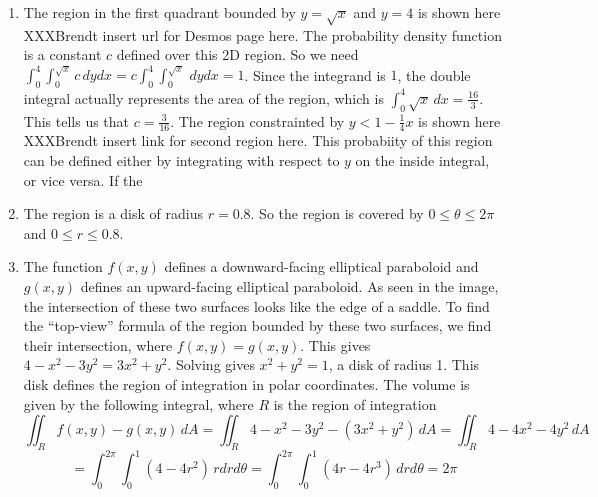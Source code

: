 \documentclass{article}
\begin{document}
\begin{enumerate}
    \item The region in the first quadrant bounded by $y=\sqrt{x}$ and $y=4$ is shown here XXXBrendt insert url for Desmos page here. The probability density function is a constant $c$ defined over this 2D region. So we need $\int_0^4\int_0^{\sqrt{x}} c \,dydx = c\int_0^4\int_0^{\sqrt{x}} \,dydx = 1$. Since the integrand is $1$, the double integral actually represents the area of the region, which is $\int_0^4 \sqrt{x}\,dx = \frac{16}{3}$. This tells us that $c=\frac{3}{16}$. The region constrainted by $y < 1-\frac{1}{4}x$ is shown here XXXBrendt insert link for second region here. This probabiity of this region can be defined either by integrating with respect to $y$ on the inside integral, or vice versa. If the 
    \item The region is a disk of radius $r=0.8$. So the region is covered by $0\leq \theta \leq 2\pi$ and $0 \leq r \leq 0.8$.
    \item The function $f(x,y)$ defines a downward-facing elliptical paraboloid and $g(x,y)$ defines an upward-facing elliptical paraboloid. As seen in the image, the intersection of these two surfaces looks like the edge of a saddle. To find the ``top-view'' formula of the region bounded by these two surfaces, we find their intersection, where $f(x,y) = g(x,y)$. This gives $4-x^2-3y^2 = 3x^2+y^2$. Solving gives $x^2+y^2=1$, a disk of radius 1. This disk defines the region of integration in polar coordinates. The volume is given by the following integral, where $R$ is the region of integration
    $$\iint_R f(x,y)-g(x,y) \,dA =
    \iint_R 4-x^2-3y^2-(3x^2+y^2)\,dA = \iint_R 4-4x^2-4y^2\,dA $$
    $$= \int_0^{2\pi}\int_0^1 (4-4r^2) \,rdrd\theta = \int_0^{2\pi}\int_0^1 (4r-4r^3) \,drd\theta = 2\pi$$
    \end{enumerate}
\end{document}
